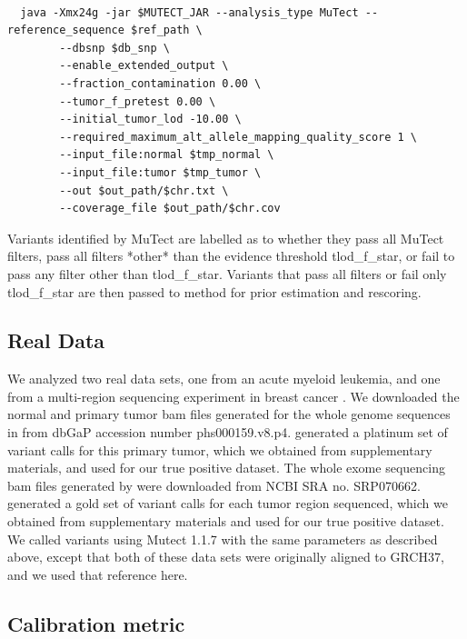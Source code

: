 \documentclass[a4,center,fleqn]{NAR}
\begin{document}
\begin{tiny}
\begin{verbatim}

  java -Xmx24g -jar $MUTECT_JAR --analysis_type MuTect --reference_sequence $ref_path \
        --dbsnp $db_snp \
        --enable_extended_output \
        --fraction_contamination 0.00 \
        --tumor_f_pretest 0.00 \
        --initial_tumor_lod -10.00 \
        --required_maximum_alt_allele_mapping_quality_score 1 \
        --input_file:normal $tmp_normal \
        --input_file:tumor $tmp_tumor \
        --out $out_path/$chr.txt \
        --coverage_file $out_path/$chr.cov

\end{verbatim}
\end{tiny}
Variants identified by MuTect are labelled as to whether they pass all MuTect filters, pass all filters *other* than the evidence threshold \textrm{tlod\_f\_star}, or fail to pass any filter other than \textrm{tlod\_f\_star}. Variants that pass all filters or fail only \textrm{tlod\_f\_star} are then passed to {method} for prior estimation and rescoring.

\subsection{Real Data}
We analyzed two real data sets, one from an acute myeloid leukemia, and one from a multi-region sequencing experiment in breast cancer \cite{Griffith2015,Shi2018}.
We downloaded the normal and primary tumor bam files generated for the whole genome sequences in \citet{Griffith2015} from dbGaP accession number phs000159.v8.p4.
\citet{Griffith2015} generated a platinum set of variant calls for this primary tumor, which we obtained from supplementary materials, and used for our true positive dataset.
The whole exome sequencing bam files generated by \citet{Shi2018} were downloaded from NCBI SRA no. SRP070662.
\citet{Shi2018} generated a gold set of variant calls for each tumor region sequenced, which we obtained from supplementary materials and used for our true positive dataset.
We called variants using Mutect 1.1.7 with the same parameters as described above, except that both of these data sets were originally aligned to GRCH37, and we used that reference here.

\subsection{Calibration metric}
\end{document}
